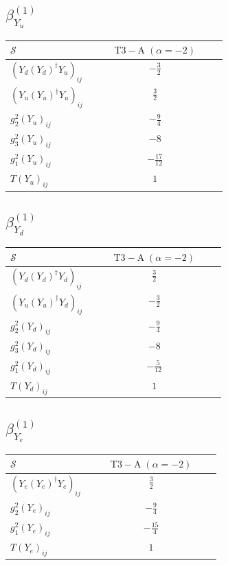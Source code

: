 \documentclass[9pt]{article}
\begin{document}
\subsection*{$ \beta_{Y_u}^{(1)} $}
\begin{longtable}{@{}p{0.38\linewidth}c@{}}
\toprule
$\mathcal{S}$ & $ \mathrm{T3-A}\;(\alpha=-2) $ \\
\midrule
$ (Y_d (Y_d)^{\dagger} Y_u)_{ij} $ & $ - \frac{3}{2} $ \\
$ (Y_u (Y_u)^{\dagger} Y_u)_{ij} $ & $ \frac{3}{2} $ \\
$ g_2^2 (Y_u)_{ij} $ & $ - \frac{9}{4} $ \\
$ g_3^2 (Y_u)_{ij} $ & $ -8 $ \\
$ g_1^2 (Y_u)_{ij} $ & $ - \frac{17}{12} $ \\
$ T (Y_u)_{ij} $ & $ 1 $ \\
\bottomrule
\end{longtable}
\subsection*{$ \beta_{Y_d}^{(1)} $}
\begin{longtable}{@{}p{0.38\linewidth}c@{}}
\toprule
$\mathcal{S}$ & $ \mathrm{T3-A}\;(\alpha=-2) $ \\
\midrule
$ (Y_d (Y_d)^{\dagger} Y_d)_{ij} $ & $ \frac{3}{2} $ \\
$ (Y_u (Y_u)^{\dagger} Y_d)_{ij} $ & $ - \frac{3}{2} $ \\
$ g_2^2 (Y_d)_{ij} $ & $ - \frac{9}{4} $ \\
$ g_3^2 (Y_d)_{ij} $ & $ -8 $ \\
$ g_1^2 (Y_d)_{ij} $ & $ - \frac{5}{12} $ \\
$ T (Y_d)_{ij} $ & $ 1 $ \\
\bottomrule
\end{longtable}
\subsection*{$ \beta_{Y_e}^{(1)} $}
\begin{longtable}{@{}p{0.38\linewidth}c@{}}
\toprule
$\mathcal{S}$ & $ \mathrm{T3-A}\;(\alpha=-2) $ \\
\midrule
$ (Y_e (Y_e)^{\dagger} Y_e)_{ij} $ & $ \frac{3}{2} $ \\
$ g_2^2 (Y_e)_{ij} $ & $ - \frac{9}{4} $ \\
$ g_1^2 (Y_e)_{ij} $ & $ - \frac{15}{4} $ \\
$ T (Y_e)_{ij} $ & $ 1 $ \\
\bottomrule
\end{longtable}
\end{document}
